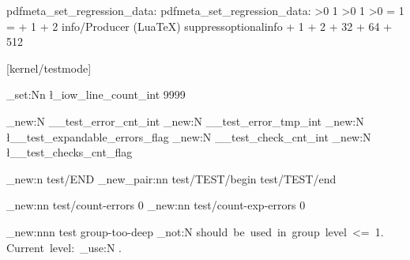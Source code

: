 \ifcsname pdfmeta_set_regression_data:\endcsname
   \csname pdfmeta_set_regression_data:\endcsname
\else
    \ifx\pdfoutput\@undefined\else\ifnum\pdfoutput>0 1\fi\fi
    \ifx\outputmode\@undefined\else\ifnum\outputmode>0 1\fi\fi
    >0 %
    \ifx\pdfvariable\@undefined
      \ifx\pdfinfoomitdate\@undefined\else
        \pdfinfoomitdate     = 1 %
        \pdfsuppressptexinfo = 
            + 1 %
            + 2 %
          \relax
        \pdftrailerid{}
      \fi
    \else
      \pdfextension info{/Producer (LuaTeX)}
      \pdfvariable suppressoptionalinfo 
          +   1 %
          +   2 %
          +  32 %
          +  64 %
          + 512 %
        \relax
    \fi
  \else
    \ifx\XeTeXversion\@undefined
    \else
    \fi
  \fi
\fi

[kernel/testmode]{}

\makeatother
\ExplSyntaxOn

\int_set:Nn \l_iow_line_count_int { 9999 }


\int_new:N \g__test_error_cnt_int
\int_new:N \g__test_error_tmp_int
\flag_new:N \l__test_expandable_errors_flag
\int_new:N \g__test_check_cnt_int
\flag_new:N \l__test_checks_cnt_flag

\hook_new:n { test/END }
\hook_new_pair:nn { test/TEST/begin } { test/TEST/end }

\socket_new:nn { test/count-errors } { 0 }
\socket_new:nn { test/count-exp-errors } { 0 }

\msg_new:nnn { test } { group-too-deep }
  {
    \exp_not:N \PASSED should~be~used~in~group~level~<=~1.~
    Current~level:~\int_use:N \currentgrouplevel.
  }


